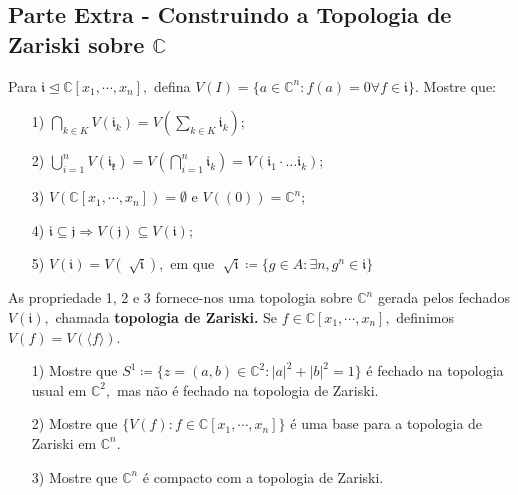 \documentclass[AlgebraII/algebraII_notes.tex]{subfiles}
\begin{document}
\subsection{Parte Extra - Construindo a Topologia de Zariski sobre \(\mathbb{C}\)}
Para \(\mathfrak{i}\trianglelefteq{\mathbb{C}[x_{1}, \cdots, x_{n}]},\) defina \(V(I) = \{a\in \mathbb{C}^{n}: f(a) = 0 \forall f\in \mathfrak{i}\}\).
Mostre que:
\begin{itemize}
	\item[1)] \(\bigcap_{k\in K}^{}{V(\mathfrak{i}_{k})} = V(\sum\limits_{k\in K}^{}\mathfrak{i}_{k})\);
	\item[2)] \(\bigcup_{i=1}^{n}{V(\mathfrak{i_{k}})} = V(\bigcap_{i=1}^{n}{\mathfrak{i}_{k}}) = V(\mathfrak{i}_{1}\cdot \dotsc \mathfrak{i}_{k})\);
	\item[3)] \(V(\mathbb{C}[x_{1}, \cdots, x_{n}]) = \emptyset\) e \(V((0)) = \mathbb{C}^{n}\);
	\item[4)] \(\mathfrak{i}\subseteq{\mathfrak{j}} \Rightarrow V(\mathfrak{j}) \subseteq{} V(\mathfrak{i})\);
	\item[5)] \(V(\mathfrak{i}) = V(\sqrt[]{\mathfrak{i}}),\) em que \(\sqrt[]{\mathfrak{i}}\coloneqq \{g\in A: \exists n, g^{n}\in \mathfrak{i}\}\)
\end{itemize}
As propriedade 1, 2 e 3 fornece-nos uma topologia sobre \(\mathbb{C}^{n}\) gerada pelos fechados \(V(\mathfrak{i}),\) chamada \textbf{topologia de Zariski.} Se
\(f\in \mathbb{C}[x_{1}, \cdots, x_{n}],\) definimos \(V(f) = V(\langle f \rangle)\).
\begin{itemize}
	\item[1)] Mostre que \(S^{1}\coloneqq \{z=(a, b)\in \mathbb{C}^{2}: |a|^{2} + |b|^{2}=1\}\) é fechado na topologia usual em
	      \(\mathbb{C}^{2},\) mas não é fechado na topologia de Zariski.
	\item[2)] Mostre que \(\{V(f): f\in \mathbb{C}[x_{1}, \cdots, x_{n}]\}\) é uma base para a topologia de Zariski em \(\mathbb{C}^{n}.\)
	\item[3)] Mostre que \(\mathbb{C}^{n}\) é compacto com a topologia de Zariski.
\end{itemize}
\end{document}
